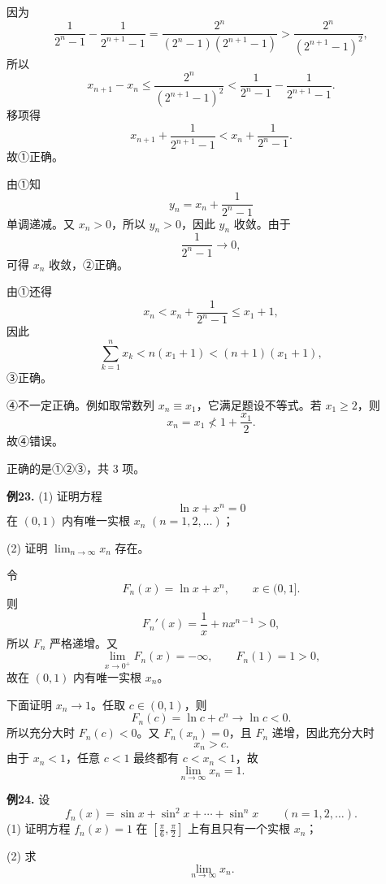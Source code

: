 \begin{solutionblock}

因为
\[
\frac1{2^n-1}-\frac1{2^{n+1}-1}
=\frac{2^n}{(2^n-1)(2^{n+1}-1)}
>
\frac{2^n}{(2^{n+1}-1)^2},
\]
所以
\[
x_{n+1}-x_n
\le \frac{2^n}{(2^{n+1}-1)^2}
<
\frac1{2^n-1}-\frac1{2^{n+1}-1}.
\]
移项得
\[
x_{n+1}+\frac1{2^{n+1}-1}
<
x_n+\frac1{2^n-1}.
\]
故①正确。

由①知
\[
y_n=x_n+\frac1{2^n-1}
\]
单调递减。又 \(x_n>0\)，所以 \(y_n>0\)，因此 \(y_n\) 收敛。由于
\[
\frac1{2^n-1}\to0,
\]
可得 \(x_n\) 收敛，②正确。

由①还得
\[
x_n<x_n+\frac1{2^n-1}\le x_1+1,
\]
因此
\[
\sum_{k=1}^n x_k<n(x_1+1)<(n+1)(x_1+1),
\]
③正确。

④不一定正确。例如取常数列 \(x_n\equiv x_1\)，它满足题设不等式。若 \(x_1\ge2\)，则
\[
x_n=x_1\not<1+\frac{x_1}{2}.
\]
故④错误。

正确的是①②③，共 3 项。

\end{solutionblock}

\begin{problemblock}
\textbf{例23.} (1) 证明方程
\[
\ln x+x^n=0
\]
在 \((0,1)\) 内有唯一实根 \(x_n\) \((n=1,2,\dots)\)；

(2) 证明 \(\displaystyle\lim_{n\to\infty}x_n\) 存在。
\end{problemblock}

\begin{solutionblock}

令
\[
F_n(x)=\ln x+x^n,\qquad x\in(0,1].
\]
则
\[
F_n'(x)=\frac1x+nx^{n-1}>0,
\]
所以 \(F_n\) 严格递增。又
\[
\lim_{x\to0^+}F_n(x)=-\infty,\qquad F_n(1)=1>0,
\]
故在 \((0,1)\) 内有唯一实根 \(x_n\)。

下面证明 \(x_n\to1\)。任取 \(c\in(0,1)\)，则
\[
F_n(c)=\ln c+c^n\to\ln c<0.
\]
所以充分大时 \(F_n(c)<0\)。又 \(F_n(x_n)=0\)，且 \(F_n\) 递增，因此充分大时
\[
x_n>c.
\]
由于 \(x_n<1\)，任意 \(c<1\) 最终都有 \(c<x_n<1\)，故
\[
\lim_{n\to\infty}x_n=1.
\]

\end{solutionblock}

\begin{problemblock}
\textbf{例24.} 设
\[
f_n(x)=\sin x+\sin^2x+\cdots+\sin^n x\qquad(n=1,2,\dots).
\]
(1) 证明方程 \(f_n(x)=1\) 在 \(\left[\frac\pi6,\frac\pi2\right]\) 上有且只有一个实根 \(x_n\)；

(2) 求
\[
\lim_{n\to\infty}x_n.
\]
\end{problemblock}

